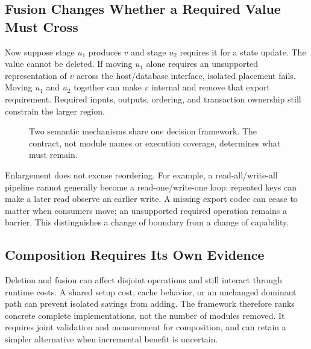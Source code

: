 \documentclass[acmsmall,screen,review,anonymous]{acmart}
\begin{document}
\subsection{Fusion Changes Whether a Required Value Must Cross}
Now suppose stage $u_1$ produces $v$ and stage $u_2$ requires it for a state
update. The value cannot be deleted. If moving $u_1$ alone requires an
unsupported representation of $v$ across the host/database interface, isolated
placement fails. Moving $u_1$ and $u_2$ together can make $v$ internal and remove
that export requirement. Required inputs, outputs, ordering, and transaction
ownership still constrain the larger region.

\begin{figure}[t]
\centering
{}
\caption{Two semantic mechanisms share one decision framework. The contract,
not module names or execution coverage, determines what must remain.}
\label{fig:fusion}
\end{figure}

Enlargement does not excuse reordering. For example, a read-all/write-all
pipeline cannot generally become a read-one/write-one loop: repeated keys can
make a later read observe an earlier write. A missing export codec can cease
to matter when consumers move; an unsupported required operation remains a
barrier. This distinguishes a change of boundary from a change of capability.

\subsection{Composition Requires Its Own Evidence}
Deletion and fusion can affect disjoint operations and still interact through
runtime costs. A shared setup cost, cache behavior, or an unchanged dominant
path can prevent isolated savings from adding. The framework therefore ranks
concrete complete implementations, not the number of modules removed. It
requires joint validation and measurement for composition, and can retain a
simpler alternative when incremental benefit is uncertain.
\end{document}
